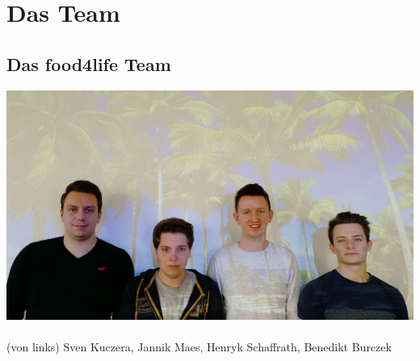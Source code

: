 \section{Das Team}
\label{concept}

\subsection{Das food4life Team}

\includegraphics[scale=0.35]{img/team.jpeg}\\
\\

(von links)
Sven Kuczera, Jannik Maes, Henryk Schaffrath, Benedikt Burczek